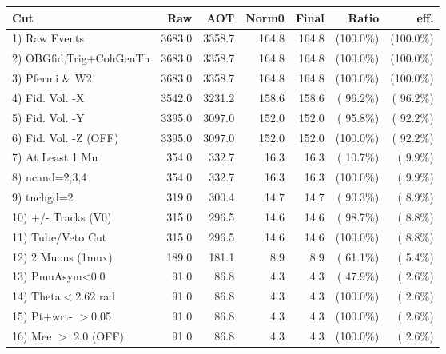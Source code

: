  \begin{table}[h!]\centering
 \begin{tabular}{||l||r|r|r|r|r|r||}
 \hline
 \hline
 Cut & Raw & AOT & Norm0 & Final & Ratio & eff.       \\
 \hline
  1) Raw Events           &       3683.0 &       3358.7 &        164.8 &        164.8 & (100.0\%) & (100.0\%) \\
  2) OBGfid,Trig+CohGenTh &       3683.0 &       3358.7 &        164.8 &        164.8 & (100.0\%) & (100.0\%) \\
  3) Pfermi \& W2         &       3683.0 &       3358.7 &        164.8 &        164.8 & (100.0\%) & (100.0\%) \\
  4) Fid. Vol. -X         &       3542.0 &       3231.2 &        158.6 &        158.6 & ( 96.2\%) & ( 96.2\%) \\
  5) Fid. Vol. -Y         &       3395.0 &       3097.0 &        152.0 &        152.0 & ( 95.8\%) & ( 92.2\%) \\
  6) Fid. Vol. -Z (OFF)   &       3395.0 &       3097.0 &        152.0 &        152.0 & (100.0\%) & ( 92.2\%) \\
  7) At Least 1 Mu        &        354.0 &        332.7 &         16.3 &         16.3 & ( 10.7\%) & (  9.9\%) \\
  8) ncand=2,3,4          &        354.0 &        332.7 &         16.3 &         16.3 & (100.0\%) & (  9.9\%) \\
  9) tnchgd=2             &        319.0 &        300.4 &         14.7 &         14.7 & ( 90.3\%) & (  8.9\%) \\
 10) +/- Tracks (V0)      &        315.0 &        296.5 &         14.6 &         14.6 & ( 98.7\%) & (  8.8\%) \\
 11) Tube/Veto Cut        &        315.0 &        296.5 &         14.6 &         14.6 & (100.0\%) & (  8.8\%) \\
 12) 2 Muons (1mux)       &        189.0 &        181.1 &          8.9 &          8.9 & ( 61.1\%) & (  5.4\%) \\
 13) PmuAsym<0.0          &         91.0 &         86.8 &          4.3 &          4.3 & ( 47.9\%) & (  2.6\%) \\
 14) Theta$<$2.62 rad     &         91.0 &         86.8 &          4.3 &          4.3 & (100.0\%) & (  2.6\%) \\
 15) Pt+wrt- $>$0.05      &         91.0 &         86.8 &          4.3 &          4.3 & (100.0\%) & (  2.6\%) \\
 16) Mee $>$ 2.0  (OFF)   &         91.0 &         86.8 &          4.3 &          4.3 & (100.0\%) & (  2.6\%) \\

\end{tabular}
\end{table}
